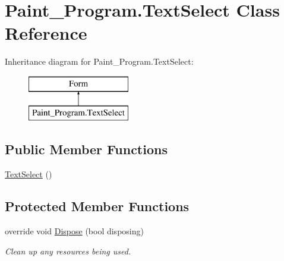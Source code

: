 \hypertarget{class_paint___program_1_1_text_select}{}\section{Paint\+\_\+\+Program.\+Text\+Select Class Reference}
\label{class_paint___program_1_1_text_select}
Inheritance diagram for Paint\+\_\+\+Program.\+Text\+Select\+:\begin{figure}[H]
\begin{center}
\leavevmode
\includegraphics[height=2.000000cm]{class_paint___program_1_1_text_select}
\end{center}
\end{figure}
\subsection*{Public Member Functions}
\begin{DoxyCompactItemize}
\item 
\mbox{\hyperlink{class_paint___program_1_1_text_select_a201ea8e6ffa368c5307ae7d0ece458c8}{Text\+Select}} ()
\end{DoxyCompactItemize}
\subsection*{Protected Member Functions}
\begin{DoxyCompactItemize}
\item 
override void \mbox{\hyperlink{class_paint___program_1_1_text_select_a5ab7cbf1dde8ef28988f054a39a34905}{Dispose}} (bool disposing)
\begin{DoxyCompactList}\small\item\em Clean up any resources being used. \end{DoxyCompactList}\end{DoxyCompactItemize}

